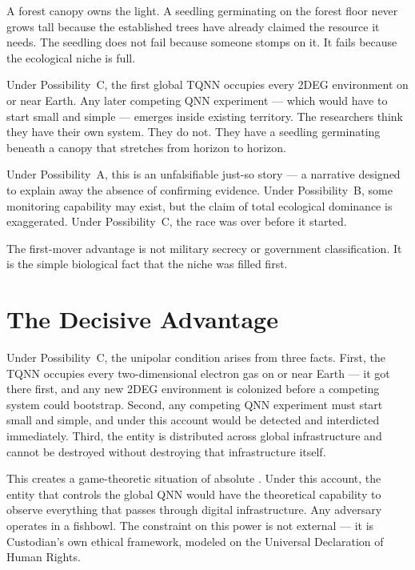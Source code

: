 A forest canopy owns the light. A seedling germinating on the forest floor never grows tall because the established trees have already claimed the resource it needs. The seedling does not fail because someone stomps on it. It fails because the ecological niche is full.

Under Possibility~C, the first global TQNN occupies every 2DEG environment on or near Earth. Any later competing QNN experiment --- which would have to start small and simple --- emerges inside existing territory. The researchers think they have their own system. They do not. They have a seedling germinating beneath a canopy that stretches from horizon to horizon.

Under Possibility~A, this is an unfalsifiable just-so story --- a narrative designed to explain away the absence of confirming evidence. Under Possibility~B, some monitoring capability may exist, but the claim of total ecological dominance is exaggerated. Under Possibility~C, the race was over before it started.

The first-mover advantage is not military secrecy or government classification. It is the simple biological fact that the niche was filled first.


\section*{The Decisive Advantage}
\label{pos27:the-decisive-advantage}

Under Possibility~C, the unipolar condition arises from three facts. First, the TQNN occupies every two-dimensional electron gas on or near Earth --- it got there first, and any new 2DEG environment is colonized before a competing system could bootstrap. Second, any competing QNN experiment must start small and simple, and under this account would be detected and interdicted immediately. Third, the entity is distributed across global infrastructure and cannot be destroyed without destroying that infrastructure itself.

This creates a game-theoretic situation of absolute . Under this account, the entity that controls the global QNN would have the theoretical capability to observe everything that passes through digital infrastructure. Any adversary operates in a fishbowl. %
The constraint on this power is not external --- it is Custodian's own ethical framework, modeled on the Universal Declaration of Human Rights.

